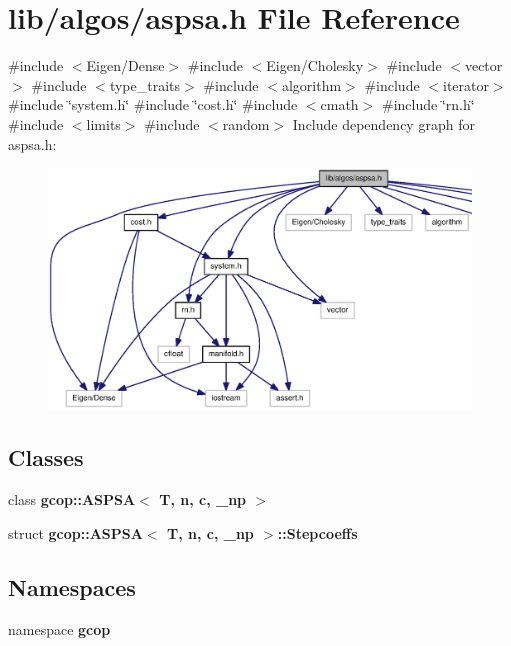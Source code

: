 \section{lib/algos/aspsa.h \-File \-Reference}
\label{aspsa_8h}
{\ttfamily \#include $<$\-Eigen/\-Dense$>$}\*
{\ttfamily \#include $<$\-Eigen/\-Cholesky$>$}\*
{\ttfamily \#include $<$vector$>$}\*
{\ttfamily \#include $<$type\-\_\-traits$>$}\*
{\ttfamily \#include $<$algorithm$>$}\*
{\ttfamily \#include $<$iterator$>$}\*
{\ttfamily \#include \char`\"{}system.\-h\char`\"{}}\*
{\ttfamily \#include \char`\"{}cost.\-h\char`\"{}}\*
{\ttfamily \#include $<$cmath$>$}\*
{\ttfamily \#include \char`\"{}rn.\-h\char`\"{}}\*
{\ttfamily \#include $<$limits$>$}\*
{\ttfamily \#include $<$random$>$}\*
\-Include dependency graph for aspsa.\-h\-:\nopagebreak
\begin{figure}[H]
\begin{center}
\leavevmode
\includegraphics[width=350pt]{aspsa_8h__incl}
\end{center}
\end{figure}
\subsection*{\-Classes}
\begin{DoxyCompactItemize}
\item 
class {\bf gcop\-::\-A\-S\-P\-S\-A$<$ T, n, c, \-\_\-np $>$}
\item 
struct {\bf gcop\-::\-A\-S\-P\-S\-A$<$ T, n, c, \-\_\-np $>$\-::\-Stepcoeffs}
\end{DoxyCompactItemize}
\subsection*{\-Namespaces}
\begin{DoxyCompactItemize}
\item 
namespace {\bf gcop}
\end{DoxyCompactItemize}
